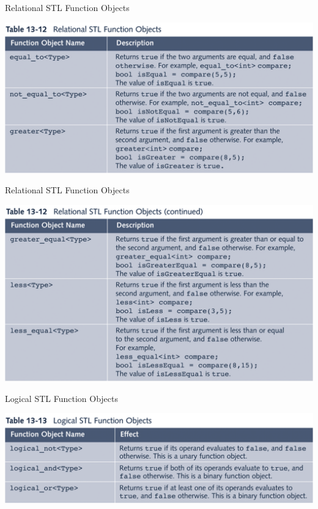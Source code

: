 \begin{frame}{Relational STL Function Objects}
\begin{center}
\includegraphics[width=\textwidth]{images/fo2}
\end{center}
\end{frame}

\begin{frame}{Relational STL Function Objects}
\begin{center}
\includegraphics[width=\textwidth]{images/fo3}
\end{center}
\end{frame}

\begin{frame}{Logical STL Function Objects}
\begin{center}
\includegraphics[width=\textwidth]{images/fo4}
\end{center}
\end{frame}

